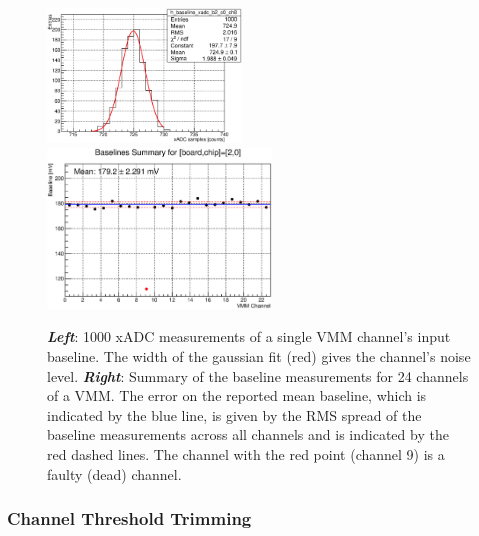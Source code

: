 \begin{figure}[!htb]
    \begin{center}
        \includegraphics[width=0.46\textwidth]{figures/nsw/calibration/xadc_calib_channel_baseline_samples}
        \includegraphics[width=0.53\textwidth]{figures/nsw/calibration/calib_baselines_vmm_summary}
        \caption{
            \textbf{\textit{Left}}: 1000 xADC measurements of a single VMM channel's input baseline.
                The width of the gaussian fit (red) gives the channel's noise level.
            \textbf{\textit{Right}}: Summary of the baseline measurements for 24 channels of a VMM.
                The error on the reported mean baseline, which is indicated by the blue line, is given by the RMS spread of the baseline measurements
                across all channels and is indicated by the red dashed lines.
                The channel with the red point (channel 9) is a faulty (dead) channel.
        }
        \label{fig:baselines_calib}
    \end{center}
\end{figure}

\subsubsection{Channel Threshold Trimming}
\label{sec:calib_trimming}

